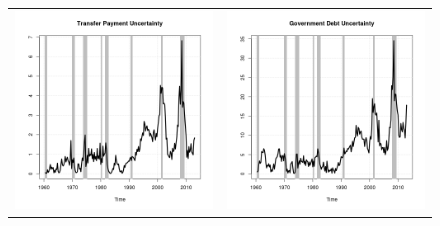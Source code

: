 \documentclass[11pt]{article}
\begin{document}
\begin{figure}
\begin{center}
\begin{tabular}{cc}
\includegraphics[scale=0.45]{./results/pics0.02/fpu_transfers.png} & \includegraphics[scale=0.45]{./results/pics0.02/fpu_debt.png}  
\end{tabular}
\end{center}
\end{figure} 
\end{document}
